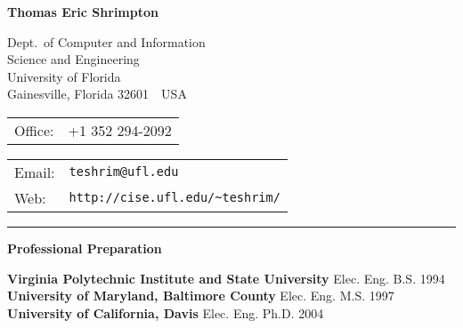\documentclass{article}[11pt]
\newcommand{\revdate}{\today}
\newlength{\headwidth}
\newlength{\sepwidth}
\newlength{\itemwidth}
\newcommand{\resitem}[2]{\noindent\vspace{.15in}\parbox[t]{\headwidth}{\bf{#1}}\hspace{\sepwidth}\parbox[t]{\itemwidth}{#2}}
\begin{document}
\begin{noindent}

\iffalse
\begin{picture}(0,0)(0,0)
\put(455,-670){\tiny rev \revdate}
\end{picture}
\vspace{-9pt}
\fi

\vspace{-0.5in}

\resitem{\mbox{}}{
{\Large \bf Thomas Eric Shrimpton}
}

\vspace{0ex}


\vspace{-3ex}

\resitem{\mbox{}}{
  \parbox[t]{4in}{
    \begin{flushleft}
    Dept.\ of Computer and Information\\
    \hspace*{3ex} Science and Engineering\\
    University of Florida\\
    Gainesville, Florida 32601\ \   USA
    \end{flushleft}
    }
  \parbox[t]{1.5in}{
        \begin{flushleft}
        \begin{tabular}{ll}
        Office:&  +1 352 294-2092
        \end{tabular}
        \end{flushleft}

  }
}

\vspace{-3ex}

\resitem{\mbox{}}{
\mbox{}\hspace{-8pt}
\begin{tabular}{ll}
\textrm{Email:} & \texttt{teshrim@ufl.edu}\\
\textrm{Web:}   & \texttt{http://cise.ufl.edu/\~{ }teshrim/}
\end{tabular}
}


\vspace{-2ex}

\noindent
\rule{6.75in}{.4mm}

\vspace{1ex}

\resitem{Professional Preparation}
{
{\bf Virginia Polytechnic Institute and State University} \hspace*{.3in}
{Elec. Eng.}\hfill
B.S. 1994\\
{\bf University of Maryland, Baltimore County} \hspace*{.9in}
{Elec. Eng.}\hfill
M.S. 1997\\
{\bf University of California, Davis} \hspace*{1.75in}
{Elec. Eng.}\hfill
Ph.D. 2004 \\
}


\end{noindent}
\end{document}
